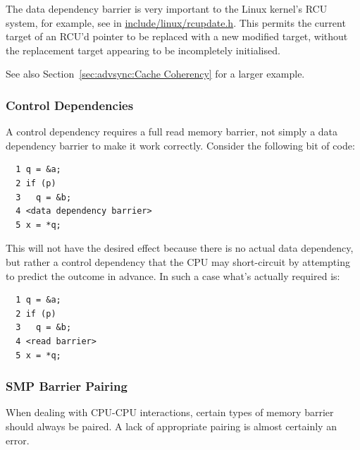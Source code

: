 The data dependency barrier is very important to the Linux kernel's
RCU system, for example,
see  in \url{include/linux/rcupdate.h}.
This permits the current
target of an RCU'd pointer to be replaced with a new modified target, without
the replacement target appearing to be incompletely initialised.

See also
Section~\ref{sec:advsync:Cache Coherency}
for a larger example.

\subsubsection{Control Dependencies}
\label{sec:advsync:Control Dependencies}

A control dependency requires a full read memory barrier, not simply a data
dependency barrier to make it work correctly.  Consider the following bit of
code:

\vspace{5pt}
\begin{minipage}[t]{\columnwidth}
\scriptsize
\begin{verbatim}
  1 q = &a;
  2 if (p)
  3   q = &b;
  4 <data dependency barrier>
  5 x = *q;
\end{verbatim}
\end{minipage}
\vspace{5pt}

This will not have the desired effect because there is no actual data
dependency, but rather a control dependency that the CPU may short-circuit by
attempting to predict the outcome in advance.  In such a case what's actually
required is:

\vspace{5pt}
\begin{minipage}[t]{\columnwidth}
\scriptsize
\begin{verbatim}
  1 q = &a;
  2 if (p)
  3   q = &b;
  4 <read barrier>
  5 x = *q;
\end{verbatim}
\end{minipage}
\vspace{5pt}

\subsubsection{SMP Barrier Pairing}
\label{sec:advsync:SMP Barrier Pairing}

When dealing with CPU-CPU interactions, certain types of memory barrier should
always be paired.  A lack of appropriate pairing is almost certainly an error.


